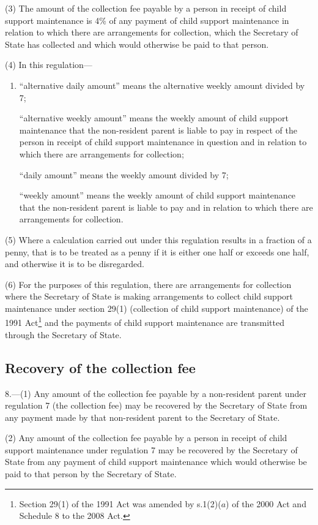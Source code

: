 \documentclass[12pt,a4paper]{article}
\begin{document}
(3) The amount of the collection fee payable by a person in receipt of child support maintenance is 4\% of any payment of child support maintenance in relation to which there are arrangements for collection, which the Secretary of State has collected and which would otherwise be paid to that person.

(4) In this regulation—
\begin{enumerate}\item[]
“alternative daily amount” means the alternative weekly amount divided by 7;

“alternative weekly amount” means the weekly amount of child support maintenance that the non-resident parent is liable to pay in respect of the person in receipt of child support maintenance in question and in relation to which there are arrangements for collection;

“daily amount” means the weekly amount divided by 7;

“weekly amount” means the weekly amount of child support maintenance that the non-resident parent is liable to pay and in relation to which there are arrangements for collection.
\end{enumerate}

(5) Where a calculation carried out under this regulation results in a fraction of a penny, that is to be treated as a penny if it is either one half or exceeds one half, and otherwise it is to be disregarded.

(6) For the purposes of this regulation, there are arrangements for collection where the Secretary of State is making arrangements to collect child support maintenance under section 29(1) (collection of child support maintenance) of the 1991 Act\footnote{Section 29(1) of the 1991 Act was amended by s.1(2)($a$)  of the 2000 Act and Schedule 8 to the 2008 Act.} and the payments of child support maintenance are transmitted through the Secretary of State.

\subsection[8. Recovery of the collection fee]{Recovery of the collection fee}

8.—(1) Any amount of the collection fee payable by a non-resident parent under regulation 7 (the collection fee) may be recovered by the Secretary of State from any payment made by that non-resident parent to the Secretary of State.

(2) Any amount of the collection fee payable by a person in receipt of child support maintenance under regulation 7 may be recovered by the Secretary of State from any payment of child support maintenance which would otherwise be paid to that person by the Secretary of State.
\end{document}
